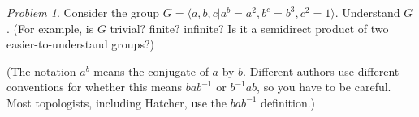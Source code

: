 \documentclass{amsart}
\theoremstyle{remark}
\newtheorem{exercise}{Problem}
\def\sset{\subseteq}
\def\gend#1{\langle #1\rangle}
\begin{document}
\begin{exercise}
    Consider the group $G=\gend{a,b,c|a^b=a^2, b^c=b^3, c^2=1}$.
    Understand $G$.  (For example, is $G$ trivial?  finite?  infinite?
    Is it a semidirect product of two easier-to-understand groups?)

    (The notation $a^b$ means the conjugate of $a$ by $b$.  Different
    authors use different conventions for whether this means $bab^{-1}$
    or $b^{-1}ab$, so you have to be careful.  Most topologists, 
    including Hatcher, use the $bab^{-1}$
    definition.)
\end{exercise}

% 
% 
% 
% 
% 
 
\end{document}
